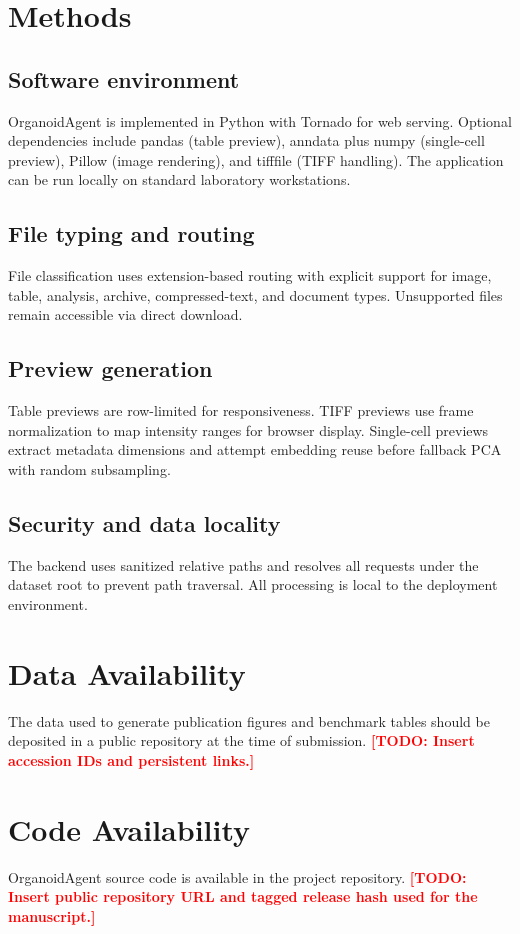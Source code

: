\documentclass[11pt]{article}
\newcommand{\todoitem}[1]{\textcolor{red}{\textbf{[TODO: #1]}}}
\begin{document}
\section{Methods}
\subsection{Software environment}
OrganoidAgent is implemented in Python with Tornado for web serving. Optional dependencies include pandas (table preview), anndata plus numpy (single-cell preview), Pillow (image rendering), and tifffile (TIFF handling). The application can be run locally on standard laboratory workstations.

\subsection{File typing and routing}
File classification uses extension-based routing with explicit support for image, table, analysis, archive, compressed-text, and document types. Unsupported files remain accessible via direct download.

\subsection{Preview generation}
Table previews are row-limited for responsiveness. TIFF previews use frame normalization to map intensity ranges for browser display. Single-cell previews extract metadata dimensions and attempt embedding reuse before fallback PCA with random subsampling.

\subsection{Security and data locality}
The backend uses sanitized relative paths and resolves all requests under the dataset root to prevent path traversal. All processing is local to the deployment environment.

\section{Data Availability}
The data used to generate publication figures and benchmark tables should be deposited in a public repository at the time of submission.
\todoitem{Insert accession IDs and persistent links.}

\section{Code Availability}
OrganoidAgent source code is available in the project repository.
\todoitem{Insert public repository URL and tagged release hash used for the manuscript.}
\end{document}
